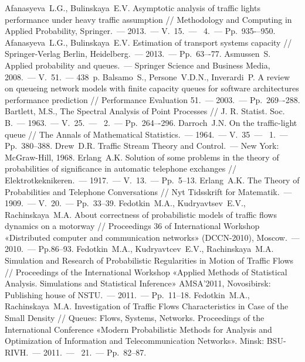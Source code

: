 \documentclass[a4paper,12pt,russian]{extarticle}
\newcommand{\No}{\textnumero}
\begin{document}
\begin{thebibliography}{99}
 Afanasyeva~L.G., Bulinskaya~E.V. Asymptotic analysis of traffic lights performance under heavy traffic assumption // Methodology and Computing in Applied Probability, Springer.~--- 2013.~--- V.~15.~--- \No{}~4.~--- Pp.~935-–950.
 Afanasyeva~L.G., Bulinskaya~E.V. Estimation of transport systems capacity // Springer-Verlag Berlin, Heidelberg.~--- 2013.~--- Pp.~63–-77.
 Asmussen~S. Applied probability and queues.~--- Springer Science and Business Media, 2008.~--- V.~51.~--- 438~p.
 Balsamo~S., Persone~V.D.N., Inverardi~P. A review on queueing network models with finite capacity queues for software architectures performance prediction // Performance Evaluation 51.~--- 2003.~--- Pp.~269–-288.
 Bartlett, M.S., The Spectral Analysis of Point Processes // J. R. Statist. Soc. B.~--- 1963.~--- V.~25.~--- \No{}~2.~--- Pp.~264–-296.
 Darroch~J.N. On the traffic-light queue // The Annals of Mathematical Statistics.~--- 1964.~--- V.~35~--- \No{}~1.~--- Pp.~380--388. 
 Drew~D.R. Traffic Stream Theory and Control.~--- New York: McGraw-Hill, 1968.
 Erlang~A.K. Solution of some problems in the theory of probabilities of significance in automatic telephone exchanges // Elektrotkeknikeren.~--- 1917.~--- V.~13.~--- Pp.~5--13.
 Erlang~A.K.  The Theory of Probabilities and Telephone Conversations //  Nyt Tidsskrift for Matematik.~--- 1909.~--- V.~20.~--- Pp.~33--39.
 Fedotkin~M.A., Kudryavtsev~E.V., Rachinskaya~M.A.  About correctness of probabilistic models of traffic flows dynamics on a motorway // Proceedings 36 of International Workshop «Distributed computer and communication networks» (DCCN-2010), Moscow.~--- 2010.~--- Pp.86--93.
 Fedotkin~M.A., Kudryavtcev~E.V., Rachinskaya~M.A. Simulation and Research of Probabilistic Regularities in Motion of Traffic Flows // Proceedings of the International Workshop «Applied Methods of Statistical Analysis. Simulations and
Statistical Inference» AMSA’2011, Novosibirsk: Publishing house of NSTU.~--- 2011.~--- Pp.~11--18.
 Fedotkin~M.A., Rachinskaya~M.A. Investigation of Traffic Flows Characteristics in Case of the Small Density // Queues: Flows, Systems, Networks. Proceedings of the International Conference «Modern Probabilistic Methods for Analysis and Optimization of Information and Telecommunication Networks». Minsk: BSU-RIVH.~--- 2011.~--- \No{}~21.~--- Pp.~82--87.

\end{thebibliography}
\end{document}
